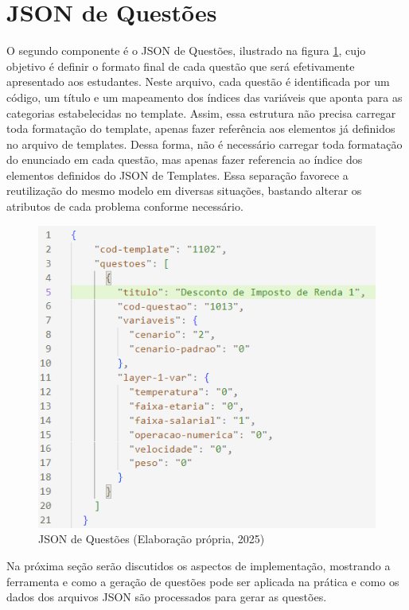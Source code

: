 \section{JSON de Questões}

O segundo componente é o JSON de Questões, ilustrado na figura \ref{fig:json-de-questoes}, cujo objetivo é definir o formato final de cada questão que será efetivamente apresentado aos estudantes. Neste arquivo, cada questão é identificada por um código, um título e um mapeamento dos índices das variáveis que aponta para as categorias estabelecidas no template. Assim, essa estrutura não precisa carregar toda formatação do template, apenas fazer referência aos elementos já definidos no arquivo de templates. Dessa forma, não é necessário carregar toda formatação do enunciado em cada questão, mas apenas fazer referencia ao índice dos elementos definidos do JSON de Templates. Essa separação favorece a reutilização do mesmo modelo em diversas situações, bastando alterar os atributos de cada problema conforme necessário.

\begin{figure}[ht]
	\centering
	\includegraphics[width=12cm]{./imagens/capitulo7/json-de-questoes}
	\caption{JSON de Questões (Elaboração própria, 2025) }
	\label{fig:json-de-questoes}
\end{figure}
Na próxima seção serão discutidos os aspectos de implementação, mostrando a ferramenta e como a geração de questões pode ser aplicada na prática e como os dados dos arquivos JSON são processados para gerar as questões.

